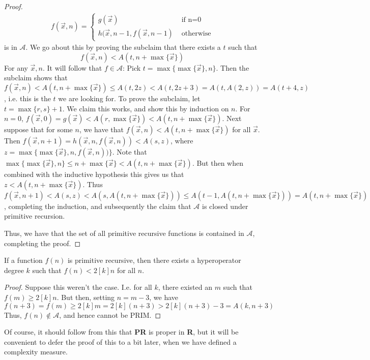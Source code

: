 \begin{proof}
    \begin{align}
        f(\vec{x},n) = \begin{cases}
                            g(\vec{x}) & \textrm{ if n=0} \\
                            h(\vec{x},n-1,f(\vec{x},n-1) & \textrm{ otherwise}
                       \end{cases}
    \end{align}
    is in $\mathcal{A}$. We go about this by proving the subclaim that there exists a $t$ such that
    \[ f(\vec{x},n) < A(t,n+\max\{\vec{x}\}) \]
    For any $\vec{x},n$. It will follow that $f \in \mathcal{A}$: Pick $t = \max\{\max\{\vec{x}\},n\}$. Then the subclaim shows that $f(\vec{x},n) < A(t,n+\max\{\vec{x}\}) \leq A(t,2z) < A(t,2z+3)=A(t,A(2,z))=A(t+4,z)$, i.e. this is the $t$ we are looking for. To prove the subclaim, let $t = \max\{r,s\}+1$. We claim this works, and show this by induction on $n$. For $n=0$, $f(\vec{x},0) = g(\vec{x}) < A(r,\max\{\vec{x}\}) < A(t,n+\max\{\vec{x}\})$. Next suppose that for some $n$, we have that $f(\vec{x},n) < A(t,n+\max\{\vec{x}\})$ for all $\vec{x}$. Then $f(\vec{x},n+1) = h(\vec{x},n,f(\vec{x},n)) < A(s,z)$, where $z = \max\{\max\{\vec{x}\},n,f(\vec{x},n))\}$. Note that $\max\{\max\{\vec{x}\},n\}\leq n+\max\{\vec{x}\} < A(t,n+\max\{\vec{x}\})$. But then when combined with the inductive hypothesis this gives us that $z < A(t,n+\max\{\vec{x}\})$. Thus $f(\vec{x},n+1) < A(s,z) < A(s,A(t,n+\max\{\vec{x}\})) \leq A(t-1,A(t,n+\max\{\vec{x}\}))= A(t,n+\max\{\vec{x}\})$, completing the induction, and subsequently the claim that $\mathcal{A}$ is closed under primitive recursion.
    \par Thus, we have that the set of all primitive recursive functions is contained in $\mathcal{A}$, completing the proof.
\end{proof}
\begin{corollary}
	If a function $f(n)$ is primitive recursive, then there exists a hyperoperator degree $k$ such that $f(n) < 2[k]n$ for all $n$.
\end{corollary}
\begin{proof}
	Suppose this weren't the case. I.e. for all $k$, there existed an $m$ such that $f(m) \geq 2[k]n$.  But then, setting $n = m-3$, we have 
	\[ f(n+3) = f(m) \geq 2[k]m = 2[k](n+3) > 2[k](n+3)-3 = A(k,n+3) \] Thus, $f(n) \notin \mathcal{A}$, and hence cannot be PRIM. 
\end{proof}
Of course, it should follow from this that \textbf{PR} is proper in \textbf{R}, but it will be convenient to defer the proof of this to a bit later, when we have defined a complexity measure.
